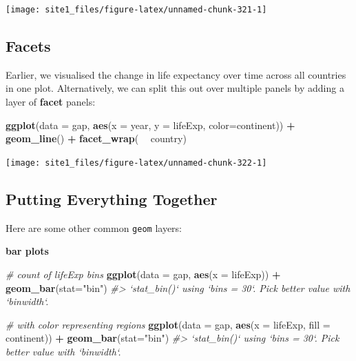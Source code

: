 \documentclass[]{book}
\newenvironment{Shaded}{\begin{snugshade}}{\end{snugshade}}
\newcommand{\KeywordTok}[1]{\textcolor[rgb]{0.13,0.29,0.53}{\textbf{#1}}}
\newcommand{\DataTypeTok}[1]{\textcolor[rgb]{0.13,0.29,0.53}{#1}}
\newcommand{\StringTok}[1]{\textcolor[rgb]{0.31,0.60,0.02}{#1}}
\newcommand{\CommentTok}[1]{\textcolor[rgb]{0.56,0.35,0.01}{\textit{#1}}}
\newcommand{\OperatorTok}[1]{\textcolor[rgb]{0.81,0.36,0.00}{\textbf{#1}}}
\newcommand{\NormalTok}[1]{#1}
\begin{document}
\begin{center}\texttt{[image: site1\_files/figure-latex/unnamed-chunk-321-1]} \end{center}

\subsection{Facets}\label{facets}

Earlier, we visualised the change in life expectancy over time across
all countries in one plot. Alternatively, we can split this out over
multiple panels by adding a layer of \textbf{facet} panels:

\begin{Shaded}
\begin{Highlighting}[]
\KeywordTok{ggplot}\NormalTok{(}\DataTypeTok{data =}\NormalTok{ gap, }\KeywordTok{aes}\NormalTok{(}\DataTypeTok{x =}\NormalTok{ year, }\DataTypeTok{y =}\NormalTok{ lifeExp, }\DataTypeTok{color=}\NormalTok{continent)) }\OperatorTok{+}
\StringTok{  }\KeywordTok{geom_line}\NormalTok{() }\OperatorTok{+}\StringTok{ }
\StringTok{  }\KeywordTok{facet_wrap}\NormalTok{( }\OperatorTok{~}\StringTok{ }\NormalTok{country)}
\end{Highlighting}
\end{Shaded}

\begin{center}\texttt{[image: site1\_files/figure-latex/unnamed-chunk-322-1]} \end{center}

\subsection{Putting Everything
Together}\label{putting-everything-together}

Here are some other common \texttt{geom} layers:

\textbf{bar plots}

\begin{Shaded}
\begin{Highlighting}[]
\CommentTok{# count of lifeExp bins}
\KeywordTok{ggplot}\NormalTok{(}\DataTypeTok{data =}\NormalTok{ gap, }\KeywordTok{aes}\NormalTok{(}\DataTypeTok{x =}\NormalTok{ lifeExp)) }\OperatorTok{+}\StringTok{ }
\StringTok{  }\KeywordTok{geom_bar}\NormalTok{(}\DataTypeTok{stat=}\StringTok{"bin"}\NormalTok{)}
\CommentTok{#> `stat_bin()` using `bins = 30`. Pick better value with `binwidth`.}

\CommentTok{# with color representing regions}
\KeywordTok{ggplot}\NormalTok{(}\DataTypeTok{data =}\NormalTok{ gap, }\KeywordTok{aes}\NormalTok{(}\DataTypeTok{x =}\NormalTok{ lifeExp, }\DataTypeTok{fill =}\NormalTok{ continent)) }\OperatorTok{+}\StringTok{ }
\StringTok{  }\KeywordTok{geom_bar}\NormalTok{(}\DataTypeTok{stat=}\StringTok{"bin"}\NormalTok{)}
\CommentTok{#> `stat_bin()` using `bins = 30`. Pick better value with `binwidth`.}
\end{Highlighting}
\end{Shaded}
\end{document}
